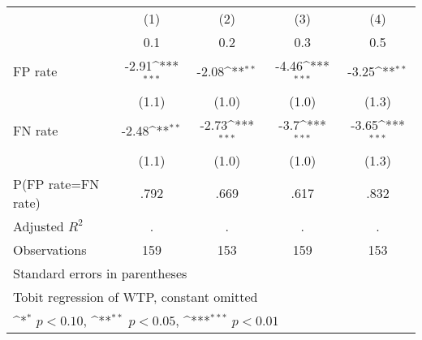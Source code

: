 {
\def\sym#1{\ifmmode^{#1}\else\(^{#1}\)\fi}
\begin{tabular}{l*{4}{c}}
\hline\hline
                &\multicolumn{1}{c}{(1)}&\multicolumn{1}{c}{(2)}&\multicolumn{1}{c}{(3)}&\multicolumn{1}{c}{(4)}\\
                &\multicolumn{1}{c}{0.1}&\multicolumn{1}{c}{0.2}&\multicolumn{1}{c}{0.3}&\multicolumn{1}{c}{0.5}\\
\hline
FP rate         &    -2.91\sym{***}&    -2.08\sym{**} &    -4.46\sym{***}&    -3.25\sym{**} \\
                &    (1.1)         &    (1.0)         &    (1.0)         &    (1.3)         \\
FN rate         &    -2.48\sym{**} &    -2.73\sym{***}&     -3.7\sym{***}&    -3.65\sym{***}\\
                &    (1.1)         &    (1.0)         &    (1.0)         &    (1.3)         \\
\hline
P(FP rate=FN rate)&     .792         &     .669         &     .617         &     .832         \\
Adjusted \(R^{2}\)&        .         &        .         &        .         &        .         \\
Observations    &      159         &      153         &      159         &      153         \\
\hline\hline
\multicolumn{5}{l}{\footnotesize Standard errors in parentheses}\\
\multicolumn{5}{l}{\footnotesize Tobit regression of WTP, constant omitted}\\
\multicolumn{5}{l}{\footnotesize \sym{*} \(p<0.10\), \sym{**} \(p<0.05\), \sym{***} \(p<0.01\)}\\
\end{tabular}
}
